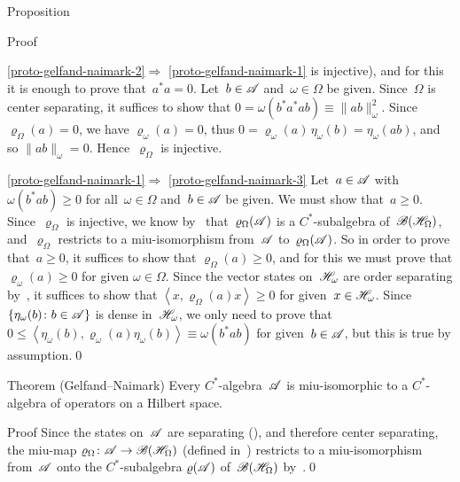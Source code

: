 \documentclass[a]{subfiles}
\begin{document}
\begin{parsec}
\begin{point}{Proposition}
\begin{point}{Proof}
\begin{point}{\ref{proto-gelfand-naimark-2}$\Longrightarrow$%
\ref{proto-gelfand-naimark-1}}
is injective),
and for this it is enough to prove that~$a^*a=0$.
Let~$b\in\mathscr{A}$ and~$\omega\in\Omega$ be given.
Since~$\Omega$ is center separating,
it suffices to show that $0=\omega(b^*a^*ab) \equiv \|ab\|_\omega^2$.
Since~$\varrho_\Omega(a)=0$,
we have $\varrho_\omega(a)=0$,
thus $0=\varrho_\omega(a)\,\eta_\omega(b)
=\eta_\omega(ab)$,
and so $\|ab\|_\omega=0$.
Hence~$\varrho_\Omega$ is injective.
\end{point}
\begin{point}{\ref{proto-gelfand-naimark-1}$\Longrightarrow$%
\ref{proto-gelfand-naimark-3}}%
Let~$a\in\mathscr{A}$ with $\omega(b^*a b)\geq 0$
for all~$\omega\in\Omega$ and~$b\in\mathscr{A}$
be given.
We must show that~$a\geq 0$.
Since~$\varrho_\Omega$ is injective,
we know by~
that~$\varrho_\Omega(\mathscr{A})$ is a $C^*$-subalgebra
of~$\mathscr{B}(\mathscr{H}_\Omega)$,
and~$\varrho_\Omega$ restricts to a miu-isomorphism
from~$\mathscr{A}$ to~$\varrho_\Omega(\mathscr{A})$.
So in order to prove that~$a\geq 0$,
it suffices to show that $\varrho_\Omega(a)\geq 0$,
and for this we must prove that $\varrho_\omega(a)\geq 0$
for given $\omega\in \Omega$.
Since the vector states on~$\mathscr{H}_\omega$ are order separating
by~, it suffices to show that 
$\left<x,\varrho_\Omega(a)x\right>\geq 0$
for given~$x\in \mathscr{H}_\omega$.
Since~$\{\eta_\omega(b)\colon b\in\mathscr{A}\}$
is dense in~$\mathscr{H}_\omega$,
we only need to prove 
that~$0\leq \left<\eta_\omega(b),\varrho_\omega(a)\eta_\omega(b)\right>
\equiv \omega(b^*ab)$ for given~$b\in \mathscr{A}$,
but this is true
by assumption.\qed
\end{point}
\end{point}
\end{point}
\begin{point}{Theorem (Gelfand--Naimark)}%
Every $C^*$-algebra~$\mathscr{A}$ is miu-isomorphic
to a $C^*$-algebra of operators on a Hilbert space.
\begin{point}{Proof}%
Since the states on~$\mathscr{A}$
are separating
(),
and therefore center separating,
the miu-map $\varrho_\Omega\colon \mathscr{A}\to\mathscr{B}(\mathscr{H}_\Omega)$
(defined in~)
restricts to a miu-isomorphism
from~$\mathscr{A}$ onto the $C^*$-subalgebra
$\varrho(\mathscr{A})$ of~$\mathscr{B}(\mathscr{H}_\Omega)$
by~.\qed
\end{point}
\end{point}
\end{parsec}
\end{document}
